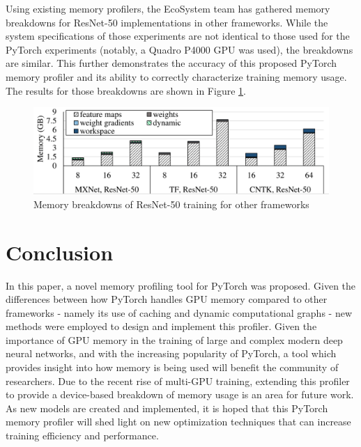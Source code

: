 \documentclass[12pt,letterpaper]{article}
\begin{document}
Using existing memory profilers, the EcoSystem team has gathered memory breakdowns for ResNet-50 implementations in other frameworks. While the system specifications of those experiments are not identical to those used for the PyTorch experiments (notably, a Quadro P4000 GPU was used), the breakdowns are similar. This further demonstrates the accuracy of this proposed PyTorch memory profiler and its ability to correctly characterize training memory usage. The results for those breakdowns are shown in Figure \ref{fig:other_frameworks_resnet}.

\begin{figure}[H]
\centering
\includegraphics[width=1.0\textwidth]{ecosystem_resnet_other_frameworks_bar_graph.PNG}
\captionsetup{width=0.8\linewidth}
\caption{Memory breakdowns of ResNet-50 training for other frameworks \cite{tbd_benchmarks}}
\label{fig:other_frameworks_resnet}
\end{figure}
\newpage

\section{Conclusion}
\label{conclusion}
In this paper, a novel memory profiling tool for PyTorch was proposed. Given the differences between how PyTorch handles GPU memory compared to other frameworks - namely its use of caching and dynamic computational graphs - new methods were employed to design and implement this profiler. Given the importance of GPU memory in the training of large and complex modern deep neural networks, and with the increasing popularity of PyTorch, a tool which provides insight into how memory is being used will benefit the community of researchers. Due to the recent rise of multi-GPU training, extending this profiler to provide a device-based breakdown of memory usage is an area for future work. As new models are created and implemented, it is hoped that this PyTorch memory profiler will shed light on new optimization techniques that can increase training efficiency and performance.
\end{document}
